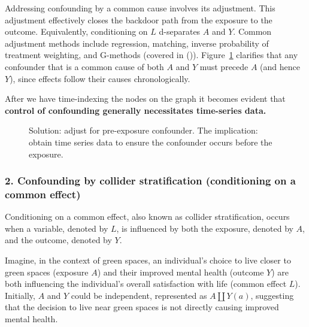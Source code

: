 \documentclass[
  singlecolumn]{article}
\begin{document}
Addressing confounding by a common cause involves its adjustment. This
adjustment effectively closes the backdoor path from the exposure to the
outcome. Equivalently, conditioning on \(L\) d-separates \(A\) and
\(Y\). Common adjustment methods include regression, matching, inverse
probability of treatment weighting, and G-methods (covered in
()).
Figure~\ref{fig-dag-common-cause-solution} clarifies that any confounder
that is a common cause of both \(A\) and \(Y\) must precede \(A\) (and
hence \(Y\)), since effects follow their causes chronologically.

After we have time-indexing the nodes on the graph it becomes evident
that \textbf{control of confounding generally necessitates time-series
data.}

\begin{figure}


\caption{\label{fig-dag-common-cause-solution}Solution: adjust for
pre-exposure confounder. The implication: obtain time series data to
ensure the confounder occurs before the exposure.}

\end{figure}%

\subsubsection{2. Confounding by collider stratification (conditioning
on a common
effect)}\label{confounding-by-collider-stratification-conditioning-on-a-common-effect}

Conditioning on a common effect, also known as collider stratification,
occurs when a variable, denoted by \(L\), is influenced by both the
exposure, denoted by \(A\), and the outcome, denoted by \(Y\).

Imagine, in the context of green spaces, an individual's choice to live
closer to green spaces (exposure \(A\)) and their improved mental health
(outcome \(Y\)) are both influencing the individual's overall
satisfaction with life (common effect \(L\)). Initially, \(A\) and \(Y\)
could be independent, represented as \(A \coprod Y(a)\), suggesting that
the decision to live near green spaces is not directly causing improved
mental health.
\end{document}
